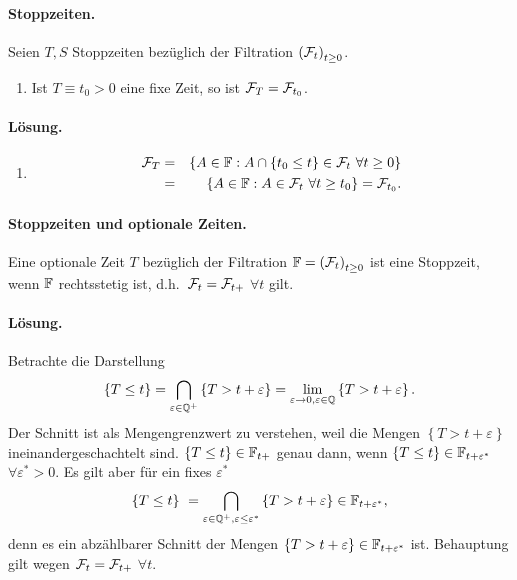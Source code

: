 



\paragraph{Stoppzeiten. } Seien $T,S$ Stoppzeiten bezüglich der Filtration
$\left( \mathcal F_t \right)_{t \geq 0}$. 
\begin{enumerate}
    \item Ist $T \equiv t_0>0$ eine fixe Zeit, so ist $\mathcal F_T=\mathcal F_{t_0}$.
\end{enumerate}

\paragraph*{Lösung. }
\begin{enumerate}
    \item \begin{eqnarray}
            \mathcal F_T &=& 
            \left\{ A\in\mathbb F : A \cap \left\{ t_0 \leq t \right\}\in\mathcal F_t \ \forall t\geq 0 \right\} \\
            &=& \left\{ A\in\mathbb F : A\in\mathcal F_t \ \forall t\geq t_0 \right\} = \mathcal F_{t_0}.
        \end{eqnarray}
\end{enumerate}


\paragraph{Stoppzeiten und optionale Zeiten. } Eine optionale Zeit $T$ bezüglich
der Filtration $\mathbb F=\left( \mathcal F_t \right)_{t \geq 0}$ ist eine Stoppzeit, wenn 
$\mathbb F$ rechtsstetig ist, d.h.\ $\mathcal F_t=\mathcal F_{t+}$ $\forall t$ gilt.

\paragraph*{Lösung.}  Betrachte die Darstellung
\begin{eqnarray}
    \left\{ T \leq t \right\} = \bigcap_{\varepsilon\in\mathbb Q^{+}} \left\{ T > t+\varepsilon \right\}
    = \lim_{\varepsilon\to 0, \varepsilon\in\mathbb Q} \left\{ T > t+\varepsilon \right\}.
\end{eqnarray}
Der Schnitt ist als Mengengrenzwert zu verstehen, weil die Mengen $\left\{ T >
t+\varepsilon \right\}$ ineinandergeschachtelt sind. $\left\{ T \leq t \right\}\in \mathbb F_{t+}$
genau dann, wenn $\left\{ T \leq t \right\}\in \mathbb F_{t+\varepsilon^{*}}$ $\forall \varepsilon^{*}>0$.
Es gilt aber für ein fixes $\varepsilon^{*}$
\begin{equation}
    \left\{ T \leq t \right\}\ = 
    \bigcap_{\varepsilon\in\mathbb Q^{+}, \varepsilon\leq \varepsilon^{*}} \left\{ T > t+\varepsilon \right\} 
    \in\mathbb F_{t+\varepsilon^{*}},
\end{equation}
denn es ein abzählbarer Schnitt der Mengen $\left\{ T> t+\varepsilon
\right\}\in\mathbb F_{t+\varepsilon^{*}}$ ist. Behauptung gilt wegen $\mathcal F_t=\mathcal F_{t+}$ $\forall t$.


